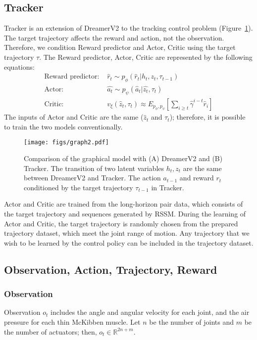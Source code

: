 \documentclass[letterpaper, 10 pt, conference]{ieeeconf}  %
\newcommand{\figref}{Figure~\ref}
\begin{document}
\subsection{Tracker}
Tracker is an extension of DreamerV2 to the tracking control problem (\figref{fig:extension}). The target trajectory affects the reward and action, not the observation. Therefore, we condition Reward predictor and Actor, Critic using the target trajectory $\tau$. The Reward predictor, Actor, Critic are represented by the following equations:
\begin{align}
\text{Reward predictor: } & \hat{r}_t \sim p_{\phi}(\hat{r}_t | h_t, z_t,\tau_{t-1})\\
\text{Actor: } & \hat{a_t} \sim p_{\psi}(\hat{a}_t | \hat{z_t}, \tau_{t})\\
\text{Critic: } & v_{\xi}(\hat{z}_t, \tau_{t}) \approx E_{p_{\phi}, p_{\psi}}\left[\sum_{i\geq t}\hat{\gamma}^{i-t}\hat{r}_i\right]
\end{align}
The inputs of Actor and Critic are the same ($\hat{z}_t$ and $\tau_t$); therefore, it is possible to train the two models conventionally.

\begin{figure}[t]
  \centering
  \texttt{[image: figs/graph2.pdf]}
  \vspace{-5mm}
  \caption{Comparison of the graphical model with (A) DreamerV2 and (B) Tracker. The transition of two latent variables $h_t, z_t$ are the same between DreamerV2 and Tracker. The action $a_{t-1}$ and reward $r_t$ conditioned by the target trajectory $\tau_{t-1}$ in Tracker.}
  \label{fig:extension}
  \vspace{-3mm}
\end{figure}

Actor and Critic are trained from the long-horizon pair data, which consists of the target trajectory and sequences generated by RSSM. During the learning of Actor and Critic, the target trajectory is randomly chosen from the prepared trajectory dataset, which meet the joint range of motion. Any trajectory that we wish to be learned by the control policy can be included in the trajectory dataset.

\subsection{Observation, Action, Trajectory, Reward}
\subsubsection{Observation}
Observation $o_t$ includes the angle and angular velocity for each joint, and the air pressure for each thin McKibben muscle. Let $n$ be the number of joints and $m$ be the number of actuators; then, $o_t \in \mathbb{R}^{2n+m}$. 
\end{document}
